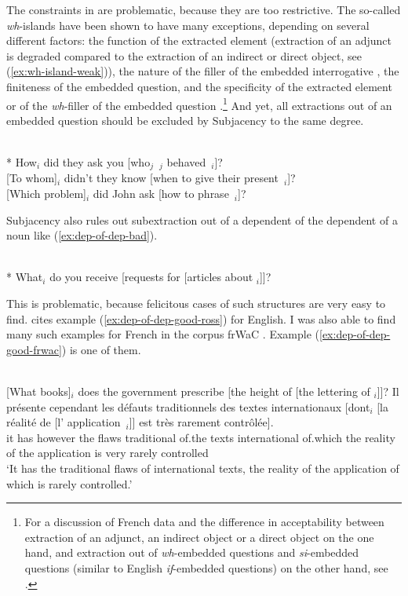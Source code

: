 The constraints in \citet{Chomsky.1973} are problematic, because they are too restrictive.\largerpage{} The so-called \emph{wh}-islands have been shown to have many exceptions, depending on several different factors: the function of the extracted element (extraction of an adjunct is degraded compared to the extraction of an indirect or direct object, see (\ref{ex:wh-island-weak})), the nature of the filler of the embedded interrogative \citep{Kluender.1993.Subjacency}, the finiteness of the embedded question, and the specificity of the extracted element or of the \emph{wh}-filler of the embedded question \citep{Kluender.1998}.\footnote{For a discussion of French data and the difference in acceptability between extraction of an adjunct, an indirect object or a direct object on the one hand, and extraction out of \emph{wh}-embedded questions and \emph{si}-embedded questions (similar to English \emph{if}-embedded questions) on the other hand, see \citet{Hirschbuehler.1992}.}
And yet, all extractions out of an embedded question should be excluded by Subjacency to the same degree. 

\eal \label{ex:wh-island-weak}
\ex \citep[1]{Cinque.1990}\\
* How$_i$ did they ask you [who$_j$~\trace{}$_j$ behaved~\trace{}$_i$]?
\ex \citep[1]{Cinque.1990}\\
{} [To whom]$_i$ didn't they know [when to give their present~\trace{}$_i$]?
\ex \citep[494]{Szabolcsi.2006}\\
{} [Which problem]$_i$ did John ask [how to phrase~\trace{}$_i$]?
\zl 

\begin{sloppypar}
Subjacency also rules out subextraction out of a dependent of the dependent of a noun like (\ref{ex:dep-of-dep-bad}).
\end{sloppypar}


\ea \citep[248]{Chomsky.1973}\\
* What$_i$ do you receive [requests for [articles about \trace{}$_i$]]?
\label{ex:dep-of-dep-bad}
\z 

This is problematic, because felicitous cases of such structures are very easy to find. \citet{Ross.1967} cites example (\ref{ex:dep-of-dep-good-ross}) for English. 
I was also able to find many such examples for French in the corpus frWaC \citep{Baroni.2009}. Example (\ref{ex:dep-of-dep-good-frwac}) is one of them. 

\eal\label{ex:dep-of-dep-good}
\ex \citep[15]{Ross.1967}\\  %
{} [What books]$_i$ does the government prescribe [the height of [the lettering of \trace{}$_i$]]?
\label{ex:dep-of-dep-good-ross}
\ex \gll Il présente cependant les défauts traditionnels des textes internationaux [dont$_i$ [la réalité de [l' application~\trace{}$_i$]] est très rarement contrôlée].\\
it has however the flaws traditional of.the texts international \sbar{}of.which \sbar{}the reality of \sbar{}the application is very rarely controlled\\
\glt `It has the traditional flaws of international texts, the reality of the application of which is rarely controlled.'
\label{ex:dep-of-dep-good-frwac}
\zl 


